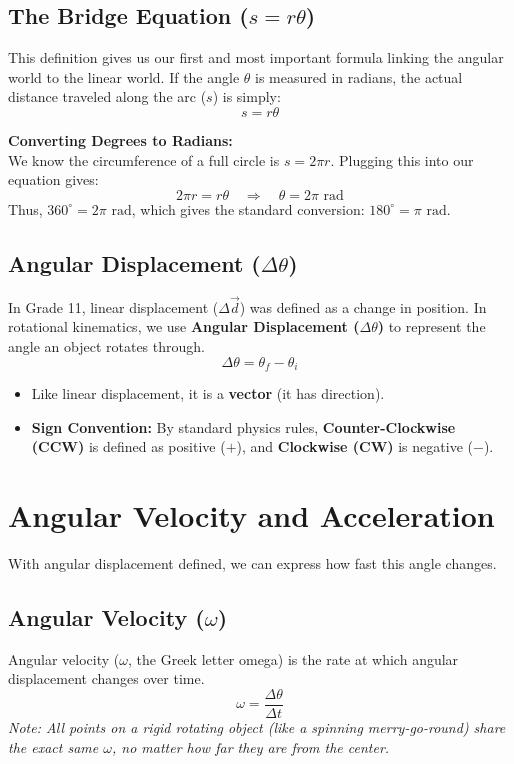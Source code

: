 \documentclass{article}
\begin{document}
\subsection{The Bridge Equation ($s = r\theta$)}
This definition gives us our first and most important formula linking the angular world to the linear world. If the angle $\theta$ is measured in radians, the actual distance traveled along the arc ($s$) is simply:
\begin{equation}
    s = r\theta
\end{equation}

\textbf{Converting Degrees to Radians:} \\
We know the circumference of a full circle is $s = 2\pi r$. Plugging this into our equation gives: 
\begin{equation*}
    2\pi r = r\theta \quad \Rightarrow \quad \theta = 2\pi \text{ rad}
\end{equation*}
Thus, $360^\circ = 2\pi \text{ rad}$, which gives the standard conversion: $180^\circ = \pi \text{ rad}$.

\subsection{Angular Displacement ($\Delta \theta$)}
In Grade 11, linear displacement ($\Delta \vec{d}$) was defined as a change in position. In rotational kinematics, we use \textbf{Angular Displacement ($\Delta \theta$)} to represent the angle an object rotates through.
\begin{equation}
    \Delta \theta = \theta_f - \theta_i
\end{equation}

\begin{itemize}
    \item Like linear displacement, it is a \textbf{vector} (it has direction).
    \item \textbf{Sign Convention:} By standard physics rules, \textbf{Counter-Clockwise (CCW)} is defined as positive ($+$), and \textbf{Clockwise (CW)} is negative ($-$).
\end{itemize}

\section{Angular Velocity and Acceleration}

With angular displacement defined, we can express how fast this angle changes.

\subsection{Angular Velocity ($\omega$)}
Angular velocity ($\omega$, the Greek letter omega) is the rate at which angular displacement changes over time.
\begin{equation}
  \omega = \frac{\Delta \theta}{\Delta t}
\end{equation}
\textit{Note: All points on a rigid rotating object (like a spinning merry-go-round) share the exact same $\omega$, no matter how far they are from the center.}
\end{document}

